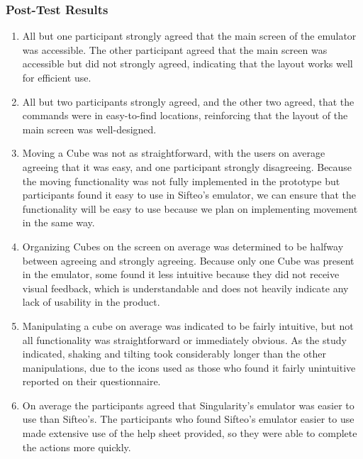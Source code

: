 \documentclass[12pt]{article}
\begin{document}
\subsubsection{Post-Test Results}
\begin{enumerate}
        \item{All but one participant strongly agreed that the main screen of the emulator was accessible. The other participant agreed that the main screen was accessible but did not strongly agreed, indicating that the layout works well for efficient use.}
        \item{All but two participants strongly agreed, and the other two agreed, that the commands were in easy-to-find locations, reinforcing that the layout of the main screen was well-designed.}
        \item{Moving a Cube was not as straightforward, with the users on average agreeing that it was easy, and one participant strongly disagreeing.  Because the moving functionality was not fully implemented in the prototype but participants found it easy to use in Sifteo's emulator, we can ensure that the functionality will be easy to use because we plan on implementing movement in the same way.}
        \item{Organizing Cubes on the screen on average was determined to be halfway between agreeing and strongly agreeing. Because only one Cube was present in the emulator, some found it less intuitive because they did not receive visual feedback, which is understandable and does not heavily indicate any lack of usability in the product.}
        \item{Manipulating a cube on average was indicated to be fairly intuitive, but not all functionality was straightforward or immediately obvious.  As the study indicated, shaking and tilting took considerably longer than the other manipulations, due to the icons used as those who found it fairly unintuitive reported on their questionnaire.}
        \item{On average the participants agreed that Singularity's emulator was easier to use than Sifteo's.  The participants who found Sifteo's emulator easier to use made extensive use of the help sheet provided, so they were able to complete the actions more quickly.}
\end{enumerate}
\end{document}
